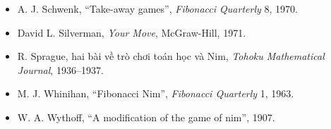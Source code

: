 \documentclass[11pt]{article}
\begin{document}
\begin{itemize}
{  of Mathematical Recreations}, Dover, 1968.
  \item A. J. Schwenk, ``Take-away games'', \textit{Fibonacci Quarterly} 8,
  1970.
  \item David L. Silverman, \textit{Your Move}, McGraw-Hill, 1971.
  \item R. Sprague, hai bài về trò chơi toán học và Nim, \textit{Tohoku
  Mathematical Journal}, 1936--1937.
  \item M. J. Whinihan, ``Fibonacci Nim'', \textit{Fibonacci Quarterly} 1, 1963.
  \item W. A. Wythoff, ``A modification of the game of nim'', 1907.
\end{itemize}
\end{document}
